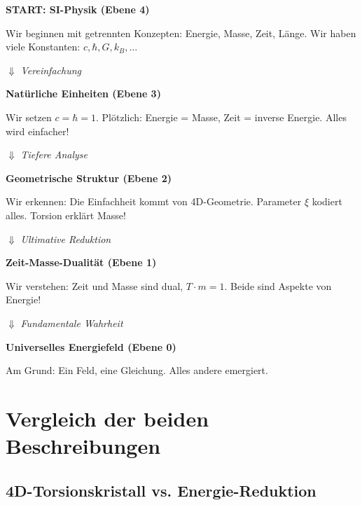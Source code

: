 \begin{philosophical}
\textbf{START: SI-Physik (Ebene 4)}

Wir beginnen mit getrennten Konzepten: Energie, Masse, Zeit, Länge. Wir haben viele Konstanten: $c, \hbar, G, k_B, \ldots$

\vspace{0.3cm}

$\Downarrow$ \textit{Vereinfachung}

\vspace{0.3cm}

\textbf{Natürliche Einheiten (Ebene 3)}

Wir setzen $c = \hbar = 1$. Plötzlich: Energie = Masse, Zeit = inverse Energie. Alles wird einfacher!

\vspace{0.3cm}

$\Downarrow$ \textit{Tiefere Analyse}

\vspace{0.3cm}

\textbf{Geometrische Struktur (Ebene 2)}

Wir erkennen: Die Einfachheit kommt von 4D-Geometrie. Parameter $\xi$ kodiert alles. Torsion erklärt Masse!

\vspace{0.3cm}

$\Downarrow$ \textit{Ultimative Reduktion}

\vspace{0.3cm}

\textbf{Zeit-Masse-Dualität (Ebene 1)}

Wir verstehen: Zeit und Masse sind dual, $T \cdot m = 1$. Beide sind Aspekte von Energie!

\vspace{0.3cm}

$\Downarrow$ \textit{Fundamentale Wahrheit}

\vspace{0.3cm}

\textbf{Universelles Energiefeld (Ebene 0)}

Am Grund: Ein Feld, eine Gleichung. Alles andere emergiert.
\end{philosophical}

\section{Vergleich der beiden Beschreibungen}

\subsection{4D-Torsionskristall vs. Energie-Reduktion}

